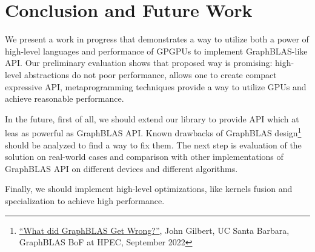 \section{Conclusion and Future Work}

We present a work in progress that demonstrates a way to utilize both a power of high-level languages and performance of GPGPUs to implement GraphBLAS-like API.
Our preliminary evaluation shows that proposed way is promising: high-level abstractions do not poor performance, allows one to create compact expressive API, metaprogramming techniques provide a way to utilize GPUs and achieve reasonable performance.

In the future, first of all, we should extend our library to provide API which at leas as powerful as GraphBLAS API. Known drawbacks of GraphBLAS design\footnote{\href{https://docs.google.com/document/d/1fMmm-Bmew0wpgJRrjyMHy6G-zPq6R6kQlRum560_4S0/edit}{``What did GraphBLAS Get Wrong?''}, John Gilbert, UC Santa Barbara, GraphBLAS BoF at HPEC, September 2022} should be analyzed to find a way to fix them.  The next step is evaluation of the solution on real-world cases and comparison with other implementations of GraphBLAS API on different devices and different algorithms.


Finally, we should implement high-level optimizations, like kernels fusion and specialization to achieve high performance.


